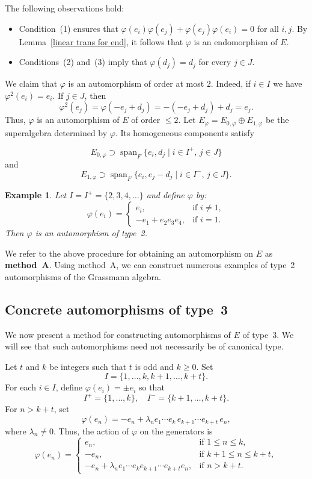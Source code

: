 \documentclass{article}
\newtheorem{example}[theorem]{Example}
\begin{document}
	The following observations hold:
	\begin{itemize}
		\item Condition~(1) ensures that 
		$\varphi(e_{i})\varphi(e_{j}) + \varphi(e_{j})\varphi(e_{i}) = 0$ 
		for all $i, j$. By Lemma~\ref{linear trans for end}, it follows that $\varphi$ is an endomorphism of $E$.
		\item Conditions~(2) and~(3) imply that $\varphi(d_j) = d_j$ for every $j \in J$.
	\end{itemize}
	
	We claim that $\varphi$ is an automorphism of order at most $2$. Indeed, 
	if $i \in I$ we have $\varphi^2(e_i) = e_i$.  
	If $j \in J$, then
	\[
	\varphi^2(e_j) = \varphi(-e_j + d_j) 
	= -(-e_j + d_j) + d_j 
	= e_j.
	\]
	Thus, $\varphi$ is an automorphism of $E$ of order $\leq 2$.  
	Let $E_\varphi = E_{0,\varphi} \oplus E_{1,\varphi}$ be the superalgebra determined by $\varphi$.  
	Its homogeneous components satisfy
	
	\[E_{0,\varphi} \supset \operatorname{span}_F\{e_i, d_j \mid i \in I^+,\, j \in J\}\] 
	and
	\[E_{1,\varphi} \supset \operatorname{span}_F\{e_i, e_j - d_j \mid i \in I^-,\, j \in J\}.\]
	
	
	\begin{example}
		Let $I = I^+ = \{2, 3, 4, \ldots\}$ and define $\varphi$ by:
		\[
		\varphi(e_i) =
		\begin{cases}
			e_i, & \text{if } i \neq 1, \\[2pt]
			-e_1 + e_2e_3e_4, & \text{if } i = 1.
		\end{cases}
		\]
		Then $\varphi$ is an automorphism of type~2.
	\end{example}
	
	We refer to the above procedure for obtaining an automorphism on $E$ as \textbf{method~A}.  
	Using method~A, we can construct numerous examples of type~2 automorphisms of the Grassmann algebra.
	
	
	\subsection{Concrete automorphisms of type~3}
	
	We now present a method for constructing automorphisms of $E$ of type~3.  
	We will see that such automorphisms need not necessarily be of canonical type.
	
	Let $t$ and $k$ be integers such that $t$ is odd and $k \geq 0$.  
	Set
	\[
	I = \{1, \ldots, k, k+1, \ldots, k+t\}.
	\]
	For each $i \in I$, define $\varphi(e_{i}) = \pm e_{i}$ so that
	\[
	I^{+} = \{1, \ldots, k\}, 
	\quad 
	I^{-} = \{k+1, \ldots, k+t\}.
	\]
	For $n > k+t$, set
	\[
	\varphi(e_{n}) = -e_{n} + \lambda_{n}e_{1} \cdots e_{k} \, e_{k+1} \cdots e_{k+t} \, e_{n},
	\]
	where $\lambda_{n}\neq 0$. Thus, the action of $\varphi$ on the generators is
	\[
	\varphi(e_{n}) =
	\begin{cases}
		e_{n}, & \text{if } 1 \leq n \leq k, \\[2pt]
		-e_{n}, & \text{if } k+1 \leq n \leq k+t, \\[2pt]
		-e_{n} + \lambda_{n}e_{1} \cdots e_{k} e_{k+1} \cdots e_{k+t} e_{n}, & \text{if } n > k+t.
	\end{cases}
	\]
	
\end{document}
